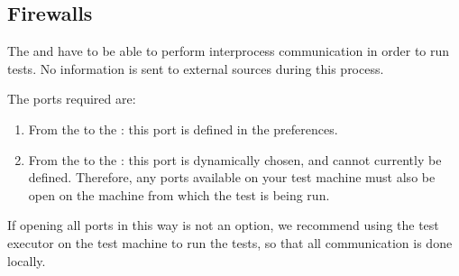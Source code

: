 \subsection{Firewalls}
The \ite{} and \gdagent{} have to be able to perform interprocess communication in order to run tests. No information is sent to external sources during this process. 

The ports required are:
\begin{enumerate}
\item From the \ite{} to the \gdagent{}: this port is defined in the  preferences.
\item From the \gdaut{} to the \ite{}: this port is dynamically chosen, and cannot currently be defined. Therefore, any ports available on your test machine must also be open on the machine from which the test is being run.
\end{enumerate}

 If opening all ports in this way is not an option, we recommend using the test executor on the test machine to run the tests, so that all communication is done locally. 

